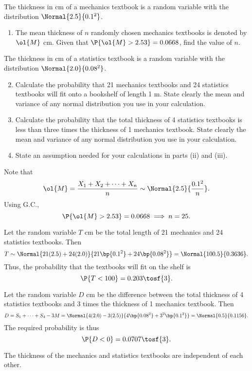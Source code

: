 \begin{problem}
    The thickness in cm of a mechanics textbook is a random variable with the distribution $\Normal{2.5}{0.1^2}$.

    \begin{enumerate}
        \item The mean thickness of $n$ randomly chosen mechanics textbooks is denoted by $\ol{M}$ cm. Given that $\P{\ol{M} > 2.53} = 0.0668$, find the value of $n$.
    \end{enumerate}

    The thickness in cm of a statistics textbook is a random variable with the distribution $\Normal{2.0}{0.08^2}$.

    \begin{enumerate}
        \setcounter{enumi}{1}
        \item Calculate the probability that 21 mechanics textbooks and 24 statistics textbooks will fit onto a bookshelf of length 1 m. State clearly the mean and variance of any normal distribution you use in your calculation.
        \item  Calculate the probability that the total thickness of 4 statistics textbooks is less than three times the thickness of 1 mechanics textbook. State clearly the mean and variance of any normal distribution you use in your calculation.
        \item State an assumption needed for your calculations in parts (ii) and (iii).
    \end{enumerate}
\end{problem}
\begin{solution}
    \begin{ppart}
        Note that \[\ol{M} = \frac{X_1 + X_2 + \dots + X_n}{n} \sim \Normal{2.5}{\frac{0.1^2}{n}}.\] Using G.C., \[\P{\ol{M} > 2.53} = 0.0668 \implies n = 25.\]
    \end{ppart}
    \begin{ppart}
        Let the random variable $T$ cm be the total length of 21 mechanics and 24 statistics textbooks. Then \[T \sim \Normal{21(2.5) + 24(2.0)}{21\bp{0.1^2} + 24\bp{0.08^2}} = \Normal{100.5}{0.3636}.\] Thus, the probability that the textbooks will fit on the shelf is \[\P{T < 100} = 0.203 \tosf{3}.\]
    \end{ppart}
    \begin{ppart}
        Let the random variable $D$ cm be the difference between the total thickness of 4 statistics textbooks and 3 times the thickness of 1 mechanics textbook. Then \[D = S_1 + \dots + S_4 - 3 M = \Normal{4(2.0) - 3(2.5)}{4\bp{0.08^2} + 3^2\bp{0.1^2}} = \Normal{0.5}{0.1156}.\] The required probability is thus \[\P{D < 0} = 0.0707 \tosf{3}.\]
    \end{ppart}
    \begin{ppart}
        The thickness of the mechanics and statistics textbooks are independent of each other.
    \end{ppart}
\end{solution}

